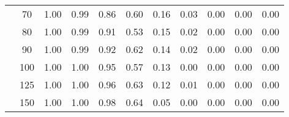 \begin{table}[t]
\begin{center}
\begin{subtable}[c]{\textwidth}
\begin{center}
\begin{tabular}{rcccccccccc}
                                        & \multicolumn{1}{c|}{70}  & \num{1.00}  & \num{0.99}  & \num{0.86}  & \num{0.60}  & \num{0.16}  & \num{0.03}  & \num{0.00}  & \num{0.00}  & \num{0.00}  \\
                                        & \multicolumn{1}{c|}{80}  & \num{1.00}  & \num{0.99}  & \num{0.91}  & \num{0.53}  & \num{0.15}  & \num{0.02}  & \num{0.00}  & \num{0.00}  & \num{0.00}  \\
                                        & \multicolumn{1}{c|}{90}  & \num{1.00}  & \num{0.99}  & \num{0.92}  & \num{0.62}  & \num{0.14}  & \num{0.02}  & \num{0.00}  & \num{0.00}  & \num{0.00}  \\
                                        & \multicolumn{1}{c|}{100}  & \num{1.00}  & \num{1.00}  & \num{0.95}  & \num{0.57}  & \num{0.13}  & \num{0.00}  & \num{0.00}  & \num{0.00}  & \num{0.00}  \\
                                        & \multicolumn{1}{c|}{125}  & \num{1.00}  & \num{1.00}  & \num{0.96}  & \num{0.63}  & \num{0.12}  & \num{0.01}  & \num{0.00}  & \num{0.00}  & \num{0.00}  \\
                                        & \multicolumn{1}{c|}{150}  & \num{1.00}  & \num{1.00}  & \num{0.98}  & \num{0.64}  & \num{0.05}  & \num{0.00}  & \num{0.00}  & \num{0.00}  & \num{0.00}  \\
                                    \end{tabular}
            \end{center}
        \end{subtable}

        \vspace{5mm}


\end{center}
\end{table}
